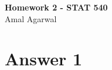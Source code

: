 \documentclass[12pt]{article}
\date{}
\begin{document}
\newtheorem{thm}{Theorem}[section]
\newtheorem{cor}[thm]{Corollary}
\newtheorem{lem}[thm]{Lemma}
\newtheorem{prop}[thm]{Proposition}
\newtheorem{defn}[thm]{Definition}
\newtheorem{exam}[thm]{Example}
\newtheorem{qstn}[thm]{Question}

\newpage
\begin{center}
{\bf Homework 2 - STAT 540}\\
Amal Agarwal
\end{center}
\section*{Answer 1}
\end{document}
